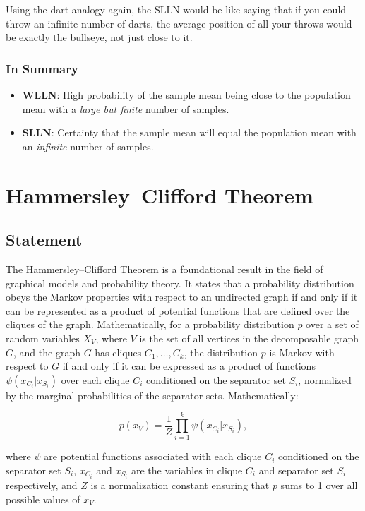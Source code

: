 \documentclass{article}
\begin{document}
Using the dart analogy again, the SLLN would be like saying that if you could throw an infinite number of darts, the average position of all your throws would be exactly the bullseye, not just close to it.

\subsubsection{In Summary}
\begin{itemize}
    \item \textbf{WLLN}: High probability of the sample mean being close to the population mean with a \textit{large but finite} number of samples.
    \item \textbf{SLLN}: Certainty that the sample mean will equal the population mean with an \textit{infinite} number of samples.
\end{itemize}

\section{Hammersley–Clifford Theorem}

\subsection{Statement}
The Hammersley–Clifford Theorem is a foundational result in the field of graphical models and probability theory. It states that a probability distribution obeys the Markov properties with respect to an undirected graph if and only if it can be represented as a product of potential functions that are defined over the cliques of the graph. Mathematically,  for a probability distribution \( p \) over a set of random variables \( X_V \), where \( V \) is the set of all vertices in the decomposable graph \( G \), and the graph \( G \) has cliques \( C_1, \ldots, C_k \), the distribution \( p \) is Markov with respect to \( G \) if and only if it can be expressed as a product of functions \( \psi(x_{C_i} | x_{S_i}) \) over each clique \( C_i \) conditioned on the separator set \( S_i \), normalized by the marginal probabilities of the separator sets. Mathematically:

\[ p(x_V) = \frac{1}{Z} \prod_{i=1}^{k} \psi(x_{C_i} | x_{S_i}), \]

where \( \psi \) are potential functions associated with each clique \( C_i \) conditioned on the separator set \( S_i \), \( x_{C_i} \) and \( x_{S_i} \) are the variables in clique \( C_i \) and separator set \( S_i \) respectively, and \( Z \) is a normalization constant ensuring that \( p \) sums to 1 over all possible values of \( x_V \).
\end{document}
